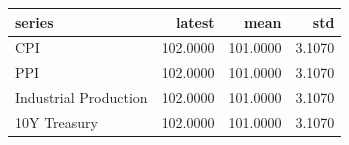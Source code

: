 \begin{tabular}{lrrr}
\toprule
series & latest & mean & std \\
\midrule
CPI & 102.0000 & 101.0000 & 3.1070 \\
PPI & 102.0000 & 101.0000 & 3.1070 \\
Industrial Production & 102.0000 & 101.0000 & 3.1070 \\
10Y Treasury & 102.0000 & 101.0000 & 3.1070 \\
\bottomrule
\end{tabular}
